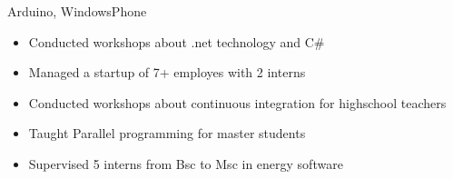 \documentclass[10pt,a4paper,ragged2e,withhyper]{altacv}
\begin{document}
\begin{paracol}{2}


   { Arduino, WindowsPhone}















  \medskip

  \medskip
  \begin{itemize}
    \item Conducted workshops about .net technology and C\#
    \item Managed a startup of 7+ employes with 2 interns
    \item Conducted workshops about continuous integration for highschool teachers
    \item Taught Parallel programming for master students
    \item Supervised 5 interns from Bsc to Msc in energy software
  \end{itemize}


\end{paracol}
\end{document}
